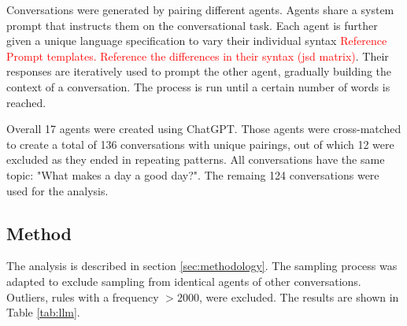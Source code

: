 \documentclass[11pt]{article}
\begin{document}
Conversations were generated by pairing different agents. Agents share a system prompt that instructs them on the conversational task. Each agent is further given a unique language specification to vary their individual syntax \textcolor{red}{Reference Prompt templates. Reference the differences in their syntax (jsd matrix)}. Their responses are iteratively used to prompt the other agent, gradually building the context of a conversation. The process is run until a certain number of words is reached.

Overall 17 agents were created using ChatGPT. Those agents were cross-matched to create a total of 136 conversations with unique pairings, out of which 12 were excluded as they ended in repeating patterns.
All conversations have the same topic: "What makes a day a good day?". The remaing 124 conversations were used for the analysis.

\subsection{Method}
The analysis is described in section \ref{sec:methodology}. The sampling process was adapted to exclude sampling from identical agents of other conversations. Outliers, rules with a frequency $>2000$, were excluded. The results are shown in Table \ref{tab:llm}.

\begin{table}
  \centering
  \caption{\label{tab:llm}
  The regression model for the GPT-4o-generated conversations. Fixed effects, except \textit{SameConversation}, are centered. The model with the lowest $AIC$ was taken ($\Delta AIC>4$ compared to the second-best model).}
  

\end{table}
\end{document}
